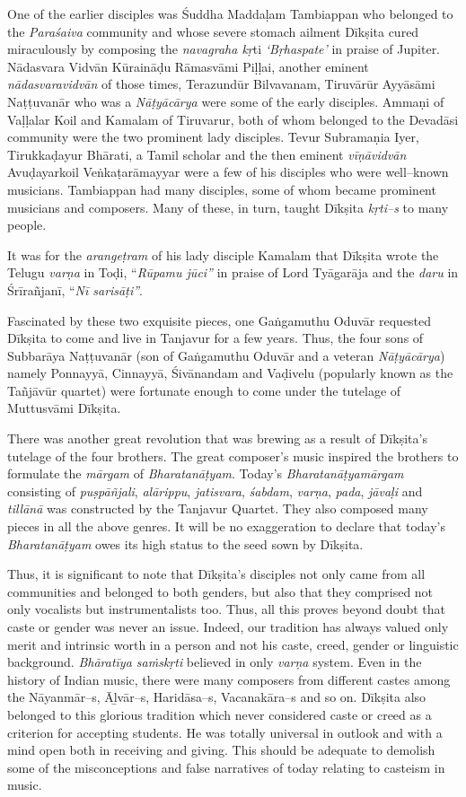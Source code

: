 One of the earlier disciples was Śuddha Maddaḷam Tambiappan who belonged to the \textit{Paraśaiva} community and whose severe stomach ailment Dīkṣita cured miraculously by composing the \textit{navagraha kṛ}ti\textit{ ‘Bṛhaspate’} in praise of Jupiter. Nādasvara Vidvān Kūraināḍu Rāmasvāmi Piḷḷai, another eminent \textit{nādasvaravidvān} of those times, Terazundūr Bilvavanam, Tiruvārūr Ayyāsāmi Naṭṭuvanār who was a \textit{Nāṭyācārya} were some of the early disciples. Ammaṇi of Vaḷḷalar Koil and Kamalam of Tiruvarur, both of whom belonged to the Devadāsi community were the two prominent lady disciples. Tevur Subramaṇia Iyer, Tirukkaḍayur Bhārati, a Tamil scholar and the then eminent \textit{vīṇāvidvān} Avuḍayarkoil Veṅkaṭarāmayyar were a few of his disciples who were well–known musicians. Tambiappan had many disciples, some of whom became prominent musicians and composers. Many of these, in turn, taught Dīkṣita \textit{kṛti–s} to many people.

It was for the \textit{arangeṭram} of his lady disciple Kamalam that Dīkṣita wrote the Telugu \textit{varṇa} in Toḍi, “\textit{Rūpamu jūci”} in praise of Lord Tyāgarāja and the \textit{daru} in Śrīrañjanī, “\textit{Nī sarisāṭi”}.

Fascinated by these two exquisite pieces, one Gaṅgamuthu Oduvār requested Dīkṣita to come and live in Tanjavur for a few years. Thus, the four sons of Subbarāya Naṭṭuvanār (son of Gaṅgamuthu Oduvār and a veteran \textit{Nāṭyācārya}) namely Ponnayyā, Cinnayyā, Śivānandam and Vaḍivelu (popularly known as the Tañjāvūr quartet) were fortunate enough to come under the tutelage of Muttusvāmi Dīkṣita.

There was another great revolution that was brewing as a result of Dīkṣita’s tutelage of the four brothers. The great composer’s music inspired the brothers to formulate the \textit{mārgam} of \textit{Bharatanāṭyam}. Today’s \textit{Bharatanāṭyamārgam} consisting of \textit{puṣpāñjali}, \textit{alārippu}, \textit{jatisvara}, \textit{śabdam}, \textit{varṇa}, \textit{pada}, \textit{jāvaḷi} and \textit{tillānā} was constructed by the Tanjavur Quartet. They also composed many pieces in all the above genres. It will be no exaggeration to declare that today’s \textit{Bharatanāṭyam} owes its high status to the seed sown by Dīkṣita.

Thus, it is significant to note that Dīkṣita's disciples not only came from all communities and belonged to both genders, but also that they comprised not only vocalists but instrumentalists too. Thus, all this proves beyond doubt that caste or gender was never an issue. Indeed, our tradition has always valued only merit and intrinsic worth in a person and not his caste, creed, gender or linguistic background. \textit{Bhāratīya saṁskṛti} believed in only \textit{varṇa} system. Even in the history of Indian music, there were many composers from different castes among the Nāyanmār–s, Āḻvār–s, Haridāsa–s, Vacanakāra–s and so on. Dīkṣita also belonged to this glorious tradition which never considered caste or creed as a criterion for accepting students. He was totally universal in outlook and with a mind open both in receiving and giving. This should be adequate to demolish some of the misconceptions and false narratives of today relating to casteism in music.


